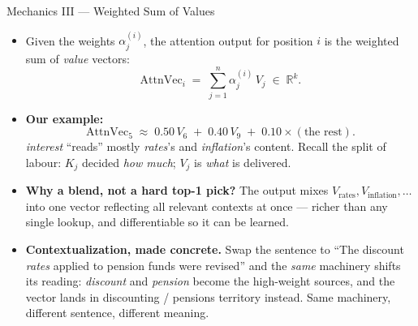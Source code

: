 \begin{frame}{Mechanics III --- Weighted Sum of Values}
\begin{itemize}
\item Given the weights $\alpha_{j}^{(i)}$, the attention output for position $i$ is the weighted sum of \emph{value} vectors:
\[
   \text{AttnVec}_{i} \;=\; \sum_{j=1}^{n} \alpha_{j}^{(i)}\, V_{j} \;\in\; \mathbb{R}^{k}.
\]

\medskip
\item \textbf{Our example:}
\[
   \text{AttnVec}_{5} \;\approx\; 0.50\,V_{6} \;+\; 0.40\,V_{9} \;+\; 0.10\times(\text{the rest}).
\]
\emph{interest} ``reads'' mostly \emph{rates}'s and \emph{inflation}'s content. Recall the split of labour: $K_j$ decided \emph{how much}; $V_j$ is \emph{what} is delivered.

\medskip
\item \textbf{Why a blend, not a hard top-1 pick?} The output mixes $V_{\text{rates}}, V_{\text{inflation}}, \ldots$ into one vector reflecting all relevant contexts at once --- richer than any single lookup, and differentiable so it can be learned.

\medskip
\item \textbf{Contextualization, made concrete.} Swap the sentence to ``The discount \emph{rates} applied to pension funds were revised'' and the \emph{same} machinery shifts its reading: \emph{discount} and \emph{pension} become the high-weight sources, and the vector lands in discounting / pensions territory instead. Same machinery, different sentence, different meaning.
\end{itemize}
\end{frame}

